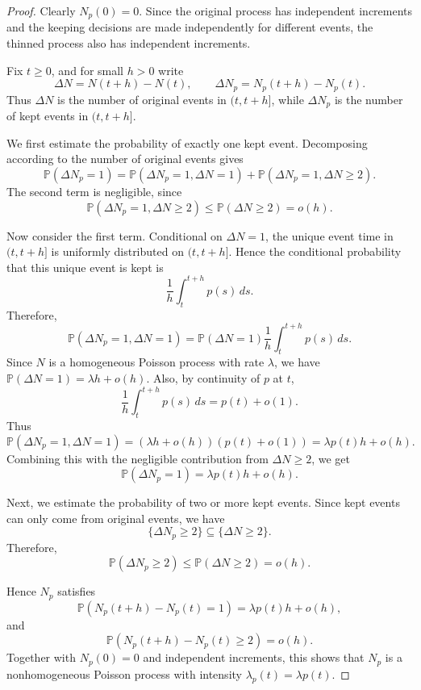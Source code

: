 \documentclass[11pt]{article}
\theoremstyle{plain}
\theoremstyle{definition}
\theoremstyle{remark}
\begin{document}
	\begin{proof}
		Clearly \(N_p(0)=0\). Since the original process has independent increments and the keeping decisions are made independently for different events, the thinned process also has independent increments.
		
		Fix \(t\ge 0\), and for small \(h>0\) write
		\[
		\Delta N=N(t+h)-N(t),
		\qquad
		\Delta N_p=N_p(t+h)-N_p(t).
		\]
		Thus \(\Delta N\) is the number of original events in \((t,t+h]\), while \(\Delta N_p\) is the number of kept events in \((t,t+h]\).
		
		We first estimate the probability of exactly one kept event. Decomposing according to the number of original events gives
		\[
		\mathbb{P}(\Delta N_p=1)
		=
		\mathbb{P}(\Delta N_p=1,\Delta N=1)
		+
		\mathbb{P}(\Delta N_p=1,\Delta N\ge 2).
		\]
		The second term is negligible, since
		\[
		\mathbb{P}(\Delta N_p=1,\Delta N\ge 2)
		\le
		\mathbb{P}(\Delta N\ge 2)
		=
		o(h).
		\]
		
		Now consider the first term. Conditional on \(\Delta N=1\), the unique event time in \((t,t+h]\) is uniformly distributed on \((t,t+h]\). Hence the conditional probability that this unique event is kept is
		\[
		\frac{1}{h}\int_t^{t+h}p(s)\,ds.
		\]
		Therefore,
		\[
		\mathbb{P}(\Delta N_p=1,\Delta N=1)
		=
		\mathbb{P}(\Delta N=1)\frac{1}{h}\int_t^{t+h}p(s)\,ds.
		\]
		Since \(N\) is a homogeneous Poisson process with rate \(\lambda\), we have \(\mathbb{P}(\Delta N=1)=\lambda h+o(h)\). Also, by continuity of \(p\) at \(t\),
		\[
		\frac{1}{h}\int_t^{t+h}p(s)\,ds=p(t)+o(1).
		\]
		Thus
		\[
		\mathbb{P}(\Delta N_p=1,\Delta N=1)
		=
		(\lambda h+o(h))(p(t)+o(1))
		=
		\lambda p(t)h+o(h).
		\]
		Combining this with the negligible contribution from \(\Delta N\ge 2\), we get
		\[
		\mathbb{P}(\Delta N_p=1)
		=
		\lambda p(t)h+o(h).
		\]
		
		Next, we estimate the probability of two or more kept events. Since kept events can only come from original events, we have
		\[
		\{\Delta N_p\ge 2\}\subseteq \{\Delta N\ge 2\}.
		\]
		Therefore,
		\[
		\mathbb{P}(\Delta N_p\ge 2)
		\le
		\mathbb{P}(\Delta N\ge 2)
		=
		o(h).
		\]
		
		Hence \(N_p\) satisfies
		\[
		\mathbb{P}(N_p(t+h)-N_p(t)=1)=\lambda p(t)h+o(h),
		\]
		and
		\[
		\mathbb{P}(N_p(t+h)-N_p(t)\ge 2)=o(h).
		\]
		Together with \(N_p(0)=0\) and independent increments, this shows that \(N_p\) is a nonhomogeneous Poisson process with intensity \(\lambda_p(t)=\lambda p(t)\).
	\end{proof}
	
\end{document}

